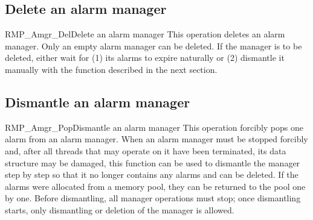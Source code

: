 \subsection{Delete an alarm manager}
\begin{apidesc}{RMP\_Amgr\_Del}{Delete an alarm manager}\label{api:RMP_Amgr_Del}
    This operation deletes an alarm manager.
    Only an empty alarm manager can be deleted.
    If the manager is to be deleted, either wait for (1) its alarms to expire naturally or (2) dismantle it manually with the function described in the next section.
    \begin{apiparams}
    \end{apiparams}
    \begin{apiret}
    \end{apiret}
\end{apidesc}

\subsection{Dismantle an alarm manager}
\begin{apidesc}{RMP\_Amgr\_Pop}{Dismantle an alarm manager}\label{api:RMP_Amgr_Pop}
    This operation forcibly pops one alarm from an alarm manager.
    When an alarm manager must be stopped forcibly and, after all threads that may operate on it have been terminated, its data structure may be damaged, this function can be used to dismantle the manager step by step so that it no longer contains any alarms and can be deleted.
    If the alarms were allocated from a memory pool, they can be returned to the pool one by one.
    Before dismantling, all manager operations must stop; once dismantling starts, only dismantling or deletion of the manager is allowed.
    \begin{apiparams}
    \end{apiparams}
    \begin{apiret}
    \end{apiret}
\end{apidesc}

